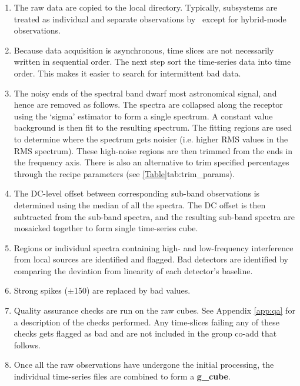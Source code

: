 \documentclass[11pt,oneside,chapters]{starlink}
\begin{document}
\begin{enumerate}[label=(\textbf{\arabic*})]

\item The raw data are copied to the local directory. Typically,
subsystems are treated as individual and separate observations by
\ORACDR\ except for hybrid-mode observations.

\item Because data acquisition is asynchronous, time slices are not
necessarily written in sequential order. The next step sort the
time-series data into time order. This makes it easier to search for
intermittent bad data.

\item The noisy ends of the spectral band dwarf most
astronomical signal, and hence are removed as follows.
The spectra are collapsed along the receptor using the `sigma'
estimator to form a single spectrum. A constant value background is
then fit to the resulting spectrum. The fitting regions are used to
determine where the spectrum gets noisier (i.e. higher RMS values in
the RMS spectrum). These high-noise regions are then trimmed from the
ends in the frequency axis.   There is also an alternative to trim
specified percentages through the  recipe parameters
(see \cref{Table}{tab:trim_params}{}).

\item The DC-level offset between corresponding sub-band observations
is determined using the median of all the spectra.  The DC offset is
then subtracted from the sub-band spectra, and the resulting sub-band
spectra are mosaicked together to form single time-series cube.

\item Regions or individual spectra containing high- and low-frequency
interference from local sources are identified and flagged.  Bad
detectors are identified by comparing the deviation from linearity of
each detector's baseline.

\item Strong spikes ($\pm$150) are replaced by bad values.

\item Quality assurance checks are run on the raw cubes. See Appendix
\ref{app:qa} for a description of the checks performed. Any
time-slices failing any of these checks gets flagged as bad and
are not included in the group co-add that follows.

\item Once all the raw observations have undergone the initial
processing, the individual time-series files are combined to form a
\textbf{g\_cube}.


\end{enumerate}
\end{document}
